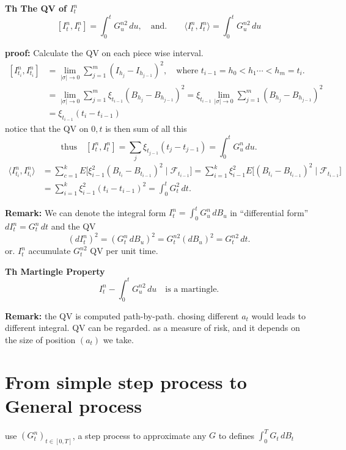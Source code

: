 \documentclass[
  letterpaper,
  DIV=11,
  numbers=noendperiod]{scrreprt}
\theoremstyle{definition}
\theoremstyle{plain}
\theoremstyle{plain}
\theoremstyle{definition}
\theoremstyle{plain}
\theoremstyle{plain}
\theoremstyle{remark}
\begin{document}
\textbf{Th The QV of \(I_t^n\)} \[
[I_t^n, I_t^n] = \int_0^t G_u^{n2} \, du, \quad \text{and.} \qquad \langle I_t^n, I_t^n\rangle = \int_0^t G_u^{n2} \, du
\]

\textbf{proof:} Calculate the QV on each piece wise interval. \[
\begin{aligned}
[I_{t_i}^n, I_{t_i}^n] &= \lim_{|\sigma| \to 0} \sum_{j=1}^{m} (I_{h_j} - I_{h_{j-1}})^2, \quad \text{where } t_{i-1} = h_0 < h_1 \cdots < h_m = t_i. \\
&= \lim_{|\sigma| \to 0} \sum_{j=1}^{m} \xi_{t_{i-1}}(B_{h_j} - B_{h_{j-1}})^2 = \xi_{t_{i-1}} \lim_{|\sigma| \to 0} \sum_{j=1}^{m} (B_{h_j} - B_{h_{j-1}})^2 \\
&= \xi_{t_{i-1}}(t_i - t_{i-1})
\end{aligned}
\] notice that the QV on \(0, t\) is then sum of all this \[
\text{thus} \quad [I_t^n, I_t^n] = \sum_j \xi_{t_{j-1}}(t_j - t_{j-1}) = \int_0^t G_u^{n} \, du.
\] \[
\begin{aligned}
\langle I_{t_i}^n, I_{t_i}^n\rangle &= \sum_{c=1}^{k} E\big[\xi_{i-1}^2(B_{t_i} - B_{t_{i-1}})^2 \mid \mathcal{F}_{t_{i-1}}\big] = \sum_{i=1}^{k} \xi_{i-1}^2 E\big[(B_{t_i} - B_{t_{i-1}})^2 \mid \mathcal{F}_{t_{i-1}}\big] \\
&= \sum_{i=1}^{k} \xi_{i-1}^2 (t_i - t_{i-1})^2 = \int_0^t G_t^2 \, dt.
\end{aligned}
\]

\textbf{Remark:} We can denote the integral form
\(I_t^n = \int_0^t G_u^n \, dB_u\) in ``differential form''
\(dI_t^n = G_t^n \, dt\) and the QV \[
(dI_t^n)^2 = (G_t^n \, dB_u)^2 = G_t^{n2}(dB_u)^2 = G_t^{n2} \, dt.
\] or. \(I_t^n\) accumulate \(G_t^{n2}\) QV per unit time.

\textbf{Th Martingle Property} \[
I_t^{n} - \int_0^t G_u^{n2} \, du \quad \text{is a martingle.}
\]

\textbf{Remark:} the QV is computed path-by-path. chosing different
\(a_t\) would leads to different integral. QV can be regarded. as a
measure of risk, and it depends on the size of position \((a_t)\) we
take.

\section{From simple step process to General
process}\label{from-simple-step-process-to-general-process}

use \((G_t^n)_{t \in [0,T]}\), a step process to approximate any \(G\)
to defines \(\int_0^T G_t \, dB_t\)
\end{document}
